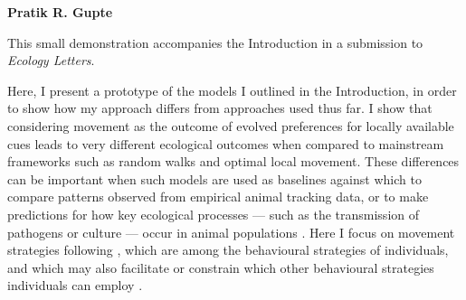 
\pagestyle{plain}

\begingroup

\let\clearpage\relax
\let\cleardoublepage\relax
\let\cleardoublepage\relax

\begin{interludeenv}

\renewcommand\thefigure{\theinterludes-\arabic{figure}}
\setcounter{figure}{0}

\label{box:demos}

\noindent \textbf{Pratik R. Gupte}

\medskip

\noindent {\large{$\Delta$}} {\footnotesize This small demonstration accompanies the Introduction in a submission to \emph{Ecology Letters}.}

\medskip

Here, I present a prototype of the models I outlined in the Introduction, in order to show how my approach differs from approaches used thus far.
I show that considering movement as the outcome of evolved preferences for locally available cues leads to very different ecological outcomes when compared to mainstream frameworks such as random walks and optimal local movement.
These differences can be important when such models are used as baselines against which to compare patterns observed from empirical animal tracking data, or to make predictions for how key ecological processes --- such as the transmission of pathogens or culture --- occur in animal populations \parencite{cantor2021}.
Here I focus on movement strategies following \textcite{bastille-rousseau2019}, which are among the behavioural strategies of individuals, and which may also facilitate or constrain which other behavioural strategies individuals can employ \citep{nathan2008a,spiegel2017}.


\end{interludeenv}
